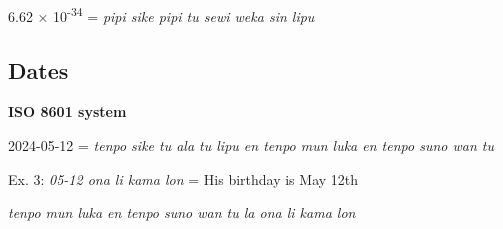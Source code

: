 \documentclass{article}
\begin{document}
	6.62 × 10\textsuperscript{-34} = \emph{pipi sike pipi tu sewi weka sin
		lipu}
	
	\subsection{Dates}
	
	\textbf{ISO 8601 system}
	\vspace{5pt}
	
	2024-05-12 = \emph{tenpo sike tu ala tu lipu en tenpo mun luka en tenpo
		suno wan tu}
	
	Ex. 3: \emph{05-12 ona li kama lon} = His birthday is May 12th
	
	\emph{tenpo mun luka en tenpo suno wan tu la ona li kama lon}

	\huge{}
	
\end{document}

